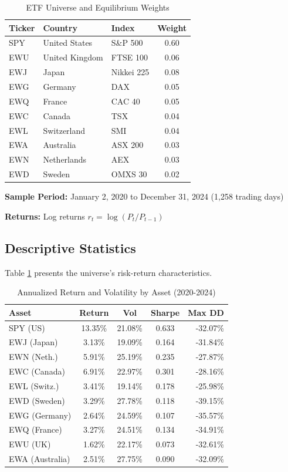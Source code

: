 \documentclass[12pt,a4paper]{article}
\begin{document}
\begin{table}[H]
\centering
\caption{ETF Universe and Equilibrium Weights}
\begin{tabular}{lllc}
\toprule
\textbf{Ticker} & \textbf{Country} & \textbf{Index} & \textbf{Weight} \\
\midrule
SPY & United States & S\&P 500 & 0.60 \\
EWU & United Kingdom & FTSE 100 & 0.06 \\
EWJ & Japan & Nikkei 225 & 0.08 \\
EWG & Germany & DAX & 0.05 \\
EWQ & France & CAC 40 & 0.05 \\
EWC & Canada & TSX & 0.04 \\
EWL & Switzerland & SMI & 0.04 \\
EWA & Australia & ASX 200 & 0.03 \\
EWN & Netherlands & AEX & 0.03 \\
EWD & Sweden & OMXS 30 & 0.02 \\
\bottomrule
\end{tabular}
\end{table}

\textbf{Sample Period:} January 2, 2020 to December 31, 2024 (1,258 trading days)

\textbf{Returns:} Log returns $r_t = \log(P_t / P_{t-1})$

\subsection{Descriptive Statistics}

Table \ref{tab:stats} presents the universe's risk-return characteristics.

\begin{table}[H]
\centering
\caption{Annualized Return and Volatility by Asset (2020-2024)}
\label{tab:stats}
\small
\begin{tabular}{lcccr}
\toprule
\textbf{Asset} & \textbf{Return} & \textbf{Vol} & \textbf{Sharpe} & \textbf{Max DD} \\
\midrule
SPY (US) & 13.35\% & 21.08\% & 0.633 & -32.07\% \\
EWJ (Japan) & 3.13\% & 19.09\% & 0.164 & -31.84\% \\
EWN (Neth.) & 5.91\% & 25.19\% & 0.235 & -27.87\% \\
EWC (Canada) & 6.91\% & 22.97\% & 0.301 & -28.16\% \\
EWL (Switz.) & 3.41\% & 19.14\% & 0.178 & -25.98\% \\
EWD (Sweden) & 3.29\% & 27.78\% & 0.118 & -39.15\% \\
EWG (Germany) & 2.64\% & 24.59\% & 0.107 & -35.57\% \\
EWQ (France) & 3.27\% & 24.51\% & 0.134 & -34.91\% \\
EWU (UK) & 1.62\% & 22.17\% & 0.073 & -32.61\% \\
EWA (Australia) & 2.51\% & 27.75\% & 0.090 & -32.09\% \\
\bottomrule
\end{tabular}
\end{table}
\end{document}
